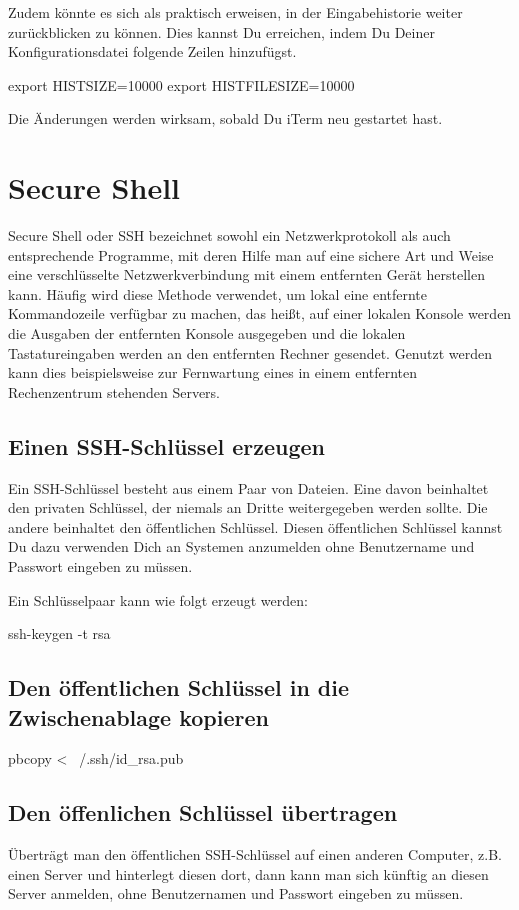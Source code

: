 \documentclass[]{article}
\begin{document}
Zudem könnte es sich als praktisch erweisen, in der Eingabehistorie weiter zurückblicken zu können. Dies kannst Du erreichen, indem Du Deiner Konfigurationsdatei folgende Zeilen hinzufügst.

\begin{bashcode}
export HISTSIZE=10000
export HISTFILESIZE=10000
\end{bashcode}

Die Änderungen werden wirksam, sobald Du iTerm neu gestartet hast.


\section{Secure Shell}
Secure Shell oder SSH bezeichnet sowohl ein Netzwerkprotokoll als auch entsprechende Programme, mit deren Hilfe man auf eine sichere Art und Weise eine verschlüsselte Netzwerkverbindung mit einem entfernten Gerät herstellen kann. Häufig wird diese Methode verwendet, um lokal eine entfernte Kommandozeile verfügbar zu machen, das heißt, auf einer lokalen Konsole werden die Ausgaben der entfernten Konsole ausgegeben und die lokalen Tastatureingaben werden an den entfernten Rechner gesendet. Genutzt werden kann dies beispielsweise zur Fernwartung eines in einem entfernten Rechenzentrum stehenden Servers.\cite{wikipediaSecureShell}
\subsection{Einen SSH-Schlüssel erzeugen}
Ein SSH-Schlüssel besteht aus einem Paar von Dateien. Eine davon beinhaltet den privaten Schlüssel, der niemals an Dritte weitergegeben werden sollte. Die andere beinhaltet den öffentlichen Schlüssel. Diesen öffentlichen Schlüssel kannst Du dazu verwenden Dich an Systemen anzumelden ohne Benutzername und Passwort eingeben zu müssen.

Ein Schlüsselpaar kann wie folgt erzeugt werden:
\begin{bashcode}
ssh-keygen -t rsa
\end{bashcode}

\subsection{Den öffentlichen Schlüssel in die Zwischenablage kopieren}
\begin{bashcode}
pbcopy < ~/.ssh/id_rsa.pub
\end{bashcode}

\subsection{Den öffenlichen Schlüssel übertragen}
Überträgt man den öffentlichen SSH-Schlüssel auf einen anderen Computer, z.B. einen Server und hinterlegt diesen dort, dann kann man sich künftig an diesen Server anmelden, ohne Benutzernamen und Passwort eingeben zu müssen.
\end{document}
